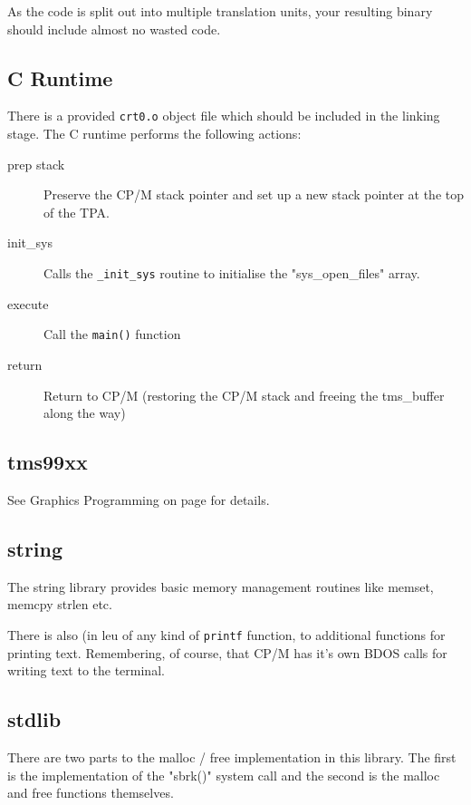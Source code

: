 \documentclass[10pt,a4paper,hidelinks]{article}
\begin{document}
As the code is split out into multiple translation units, your resulting binary
should include almost no wasted code.


\subsection{C Runtime}

There is a provided \texttt{crt0.o} object file which should be included in the
linking stage.  The C runtime performs the following actions:

\begin{description}
  \item[prep stack] Preserve the CP/M stack pointer and set up a new stack
    pointer at the top of the TPA.
  \item[init\_sys] Calls the \texttt{\_init\_sys} routine to initialise the
    "sys\_open\_files" array.
  \item[execute] Call the \texttt{main()} function
  \item[return] Return to CP/M (restoring the CP/M stack and freeing the
    tms\_buffer along the way)
\end{description}

\subsection{tms99xx}

See Graphics Programming on page \pageref{graphicsprogramming} for details.

\subsection{string}

The string library provides basic memory management routines like memset, memcpy
strlen etc.

There is also (in leu of any kind of \texttt{printf} function, to additional
functions for printing text.  Remembering, of course, that CP/M has it's own
BDOS calls for writing text to the terminal.

\subsection{stdlib}

There are two parts to the malloc / free implementation in this library.  The
first is the implementation of the "sbrk()" system call and the second is the
malloc and free functions themselves.
\end{document}

